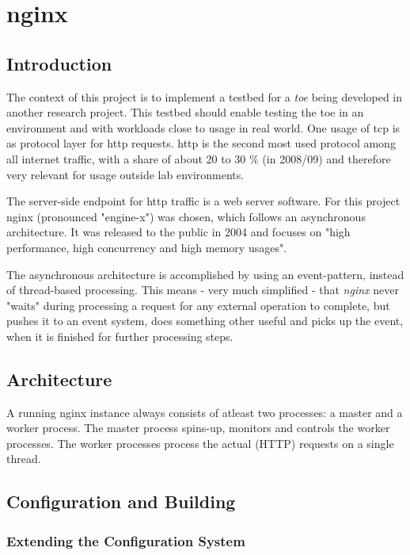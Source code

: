 \chapter{nginx}

\section{Introduction}

The context of this project is to implement a testbed for a \textit{\gls{toe}} being developed in another research project. This testbed should enable testing the \gls{toe} in an environment and with workloads close to usage in real world. One usage of \gls{tcp} is as protocol layer for \gls{http} requests. \gls{http} is the second most used protocol among all internet traffic, with a share of about 20 to 30 \% (in 2008/09) \cite{internet_study} and therefore very relevant for usage outside lab environments. 

The server-side endpoint for \gls{http} traffic is a web server software. For this project nginx (pronounced "engine-x") was chosen, which follows an asynchronous architecture. It was released to the public in 2004 and focuses on "high performance, high concurrency and high memory usages"\cite{aosa}.

The asynchronous architecture is accomplished by using an event-pattern, instead of thread-based processing. This means - very much simplified - that \textit{nginx} never "waits" during processing a request for any external operation to complete, but pushes it to an event system, does something other useful and picks up the event, when it is finished for further processing steps.

\section{Architecture}

A running nginx instance always consists of atleast two processes: a master and a worker process. The master process spins-up, monitors and controls the worker processes. The worker processes process the actual (HTTP) requests on a single thread.

\section{Configuration and Building}

\subsection{Extending the Configuration System}

